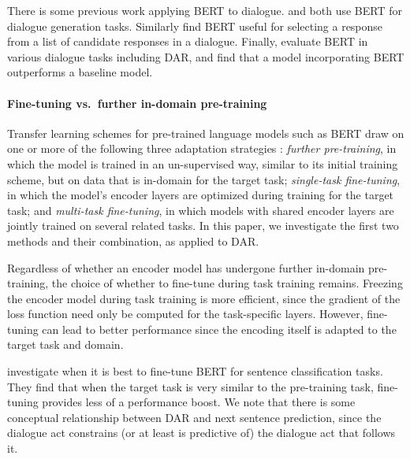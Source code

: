 \documentclass[11pt,a4paper]{article}
\begin{document}
There is some previous work applying BERT to dialogue.
\citet{baoPLATOPretrainedDialogue2019} and \citet{chenSemanticallyConditionedDialog2019a} both use BERT for dialogue generation tasks.
Similarly \citet{vigComparisonTransferLearningApproaches2019} find BERT useful for selecting a response from a list of candidate responses in a dialogue.
Finally, \citet{mehriPretrainingMethodsDialog2019} evaluate BERT in various dialogue tasks including DAR, and find that a model incorporating BERT outperforms a baseline model.




\paragraph{Fine-tuning vs.~further in-domain pre-training}
Transfer learning schemes for pre-trained language models such as BERT draw on one or more of the following three adaptation strategies \citep{sunHowFineTuneBERT2019}:
\emph{further pre-training}, in which the model is trained in an un-supervised way, similar to its initial training scheme, but on data that is in-domain for the target task; 
\emph{single-task fine-tuning}, in which the model's encoder layers are optimized during training for the target task;
and \emph{multi-task fine-tuning}, in which models with shared encoder layers are jointly trained on several related tasks.
In this paper, we investigate the first two methods and their combination, as applied to DAR.

Regardless of whether an encoder model has undergone further in-domain pre-training, the choice of whether to fine-tune during task training remains.
Freezing the encoder model during task training is more efficient, since the gradient of the loss function need only be computed for the task-specific layers.
However, fine-tuning can lead to better performance since the encoding itself is adapted to the target task and domain.

\citet{petersTuneNotTune2019} investigate when it is best to fine-tune BERT for sentence classification tasks.
They find that when the target task is very similar to the pre-training task, fine-tuning provides less of a performance boost.
We note that there is some conceptual relationship between DAR and next sentence prediction, since the dialogue act constrains (or at least is predictive of) the dialogue act that follows it.
\end{document}
